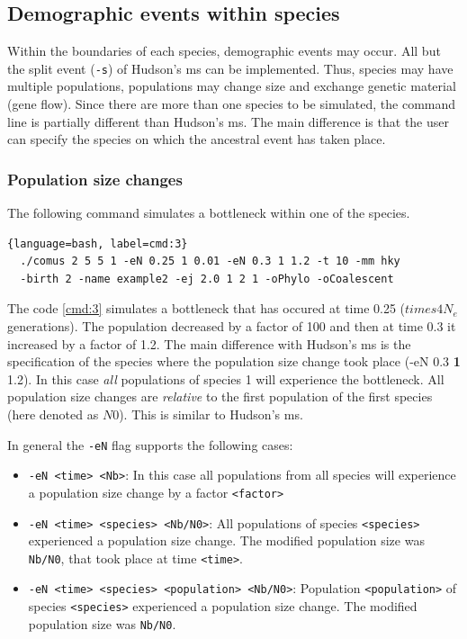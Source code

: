 



\subsection{Demographic events within species}
Within the boundaries of each species, demographic events may occur. All but the split event (\verb!-s!) of Hudson's ms can be implemented. Thus, species may have multiple populations, populations may change size and exchange genetic material (gene flow). Since there are more than one species to be simulated, the command line is partially different than Hudson's ms. The main difference is that the user can specify the species on which the ancestral event has taken place. 

\subsubsection{Population size changes}
The following command simulates a bottleneck within one of the species.

\begin{lstlisting}[label=cmd:3, caption={Command line to produce a bottleneck within one species}]{language=bash, label=cmd:3}
  ./comus 2 5 5 1 -eN 0.25 1 0.01 -eN 0.3 1 1.2 -t 10 -mm hky 
  -birth 2 -name example2 -ej 2.0 1 2 1 -oPhylo -oCoalescent
\end{lstlisting}

The code \ref{cmd:3} simulates a bottleneck that has occured at time 0.25 ($times 4 N_e$ generations). The population decreased by a factor of 100 and then at time 0.3 it increased by a factor of 1.2. The main difference with Hudson's ms is the specification of the species where the population size change took place (-eN 0.3 {\bf 1} 1.2). In this case \emph{all} populations of species 1 will experience the bottleneck. All population size changes are \emph{relative} to the first population of the first species (here denoted as $N0$). This is similar to Hudson's ms. 

In general the \verb!-eN! flag supports the following cases:

\begin{itemize}
\item \verb!-eN <time> <Nb>!: In this case all populations from all species will experience a population size change by a factor \verb!<factor>!
\item \verb!-eN <time> <species> <Nb/N0>!: All populations of species \verb!<species>! experienced a population size change. The modified population size was \verb!Nb/N0!, that took place at time \verb!<time>!.
\item \verb!-eN <time> <species> <population> <Nb/N0>!: Population \verb!<population>! of species \verb!<species>! experienced a population size change. The modified population size was \verb!Nb/N0!. 
\end{itemize} 

